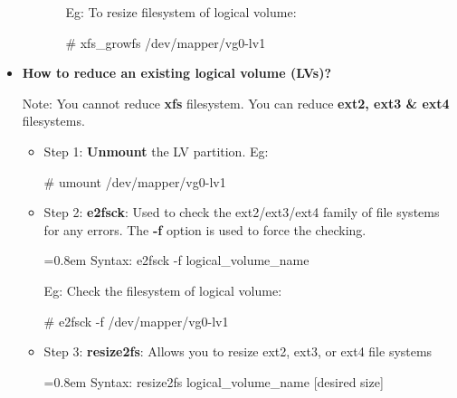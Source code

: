 \begin{flushleft}
\begin{itemize}
\begin{itemize}
\begin{itemize}
			Eg: To resize filesystem of logical volume:
			\begin{tcolorbox}[breakable,notitle,boxrule=-0pt,colback=black,colframe=black]
				\color{green}
				\font=9pt
				\# xfs\_growfs /dev/mapper/vg0-lv1
				\font=4pt
			\end{tcolorbox}
			
			\end{itemize}
	\end{itemize}				
	
	\bigskip
	\bigskip
	
	\item  \textbf{How to reduce an existing logical volume (LVs)?}
	
	\begin{tcolorbox}[breakable,notitle,boxrule=-0pt,colback=yellow,colframe=yellow]
		\color{black}
		Note: You cannot reduce \textbf{xfs} filesystem. You can reduce \textbf{ext2, ext3 \& ext4} filesystems.
	\end{tcolorbox}
	
	\begin{itemize}
		\item Step 1: 
		\newline
		\textbf{Unmount} the LV partition. 
		\newline Eg:
		\begin{tcolorbox}[breakable,notitle,boxrule=-0pt,colback=black,colframe=black]
			\color{green}
			\font=9pt
			\# umount /dev/mapper/vg0-lv1
			\font=4pt
		\end{tcolorbox}
		\item Step 2:
		\newline
		\textbf{e2fsck}: Used to check the ext2/ext3/ext4 family of file systems for any errors.
		The \textbf{-f} option is used to force the checking.
		\begin{tcolorbox}[breakable,notitle,boxrule=-0pt,colback=pink,colframe=pink]
			\color{black}
			\font=0.8em
			Syntax: e2fsck -f logical\_volume\_name
			\font=4pt
		\end{tcolorbox}
		
		Eg: Check the filesystem of logical volume:
		\begin{tcolorbox}[breakable,notitle,boxrule=-0pt,colback=black,colframe=black]
			\color{green}
			\font=9pt
			\# e2fsck -f /dev/mapper/vg0-lv1
			\font=4pt
		\end{tcolorbox}
		
		\item Step 3:
		\newline
		\textbf{resize2fs}: Allows you to resize ext2, ext3, or ext4 file systems 
		\begin{tcolorbox}[breakable,notitle,boxrule=-0pt,colback=pink,colframe=pink]
			\color{black}
			\font=0.8em
			Syntax: resize2fs logical\_volume\_name [desired size]
			\font=4pt
		\end{tcolorbox}
		

\end{itemize}
\end{itemize}
\end{flushleft}
